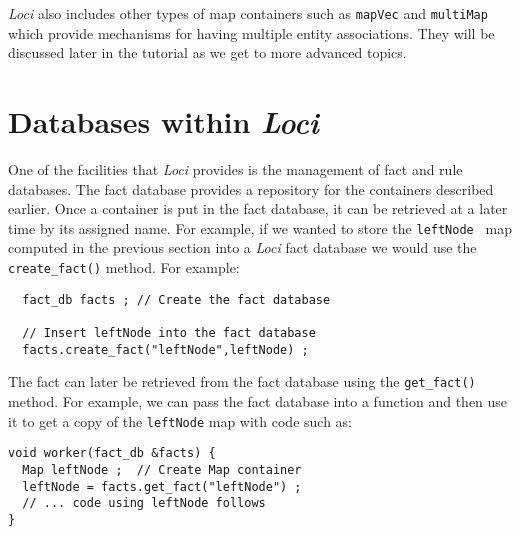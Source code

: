 \documentclass[10pt,epsf]{book}
\begin{document}
{\it Loci} also includes other types of map containers such as {\tt mapVec}
and {\tt multiMap} which provide mechanisms for having multiple entity
associations.  They will be discussed later in the tutorial as we get
to more advanced topics.

\section{Databases within {\it Loci}}

One of the facilities that {\it Loci} provides is the management of fact and
rule databases.  The fact database provides a repository for the
containers described earlier.  Once a container is put in the fact
database, it can be retrieved at a later time by its assigned name.  For example, if we wanted to store the {\tt leftNode } map computed in the previous section into a {\it Loci} fact database we would use the {\tt create\_fact()} method.  For example:
\begin{verbatim}
  fact_db facts ; // Create the fact database
  
  // Insert leftNode into the fact database
  facts.create_fact("leftNode",leftNode) ;
\end{verbatim}

The fact can later be retrieved from the fact database using the {\tt get\_fact()} method.  For example, we can pass the fact database into a function and then use it to get a copy of the {\tt leftNode} map with code such as:
\begin{verbatim}
void worker(fact_db &facts) {
  Map leftNode ;  // Create Map container
  leftNode = facts.get_fact("leftNode") ;
  // ... code using leftNode follows
}
\end{verbatim}
\end{document}
